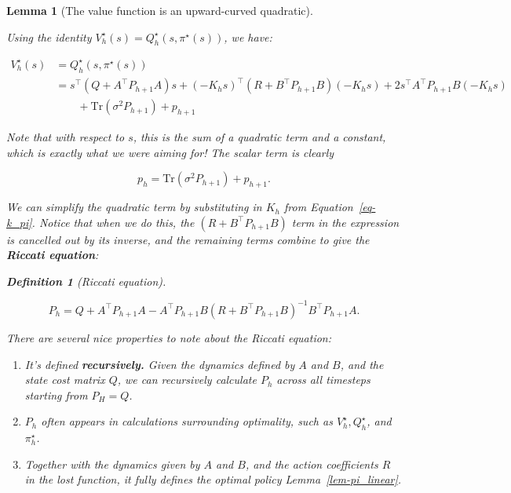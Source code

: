 \documentclass[
  letterpaper,
  DIV=11,
  numbers=noendperiod]{scrreprt}
\providecommand{\tightlist}{%
  \setlength{\itemsep}{0pt}\setlength{\parskip}{0pt}}\usepackage{longtable,booktabs,array}
\theoremstyle{plain}
\newtheorem{lemma}{Lemma}[chapter]
\theoremstyle{plain}
\theoremstyle{definition}
\theoremstyle{definition}
\newtheorem{definition}{Definition}[chapter]
\theoremstyle{remark}
\begin{document}
\begin{lemma}[The value function is an upward-curved
quadratic]\protect\hypertarget{lem-upward-curved}{}\label{lem-upward-curved}

Using the identity \(V^\star_h(s) = Q^\star_h(s, \pi^\star(s))\), we
have:

\[
\begin{aligned}
    V^\star_h(s) & = Q^\star_h(s, \pi^\star(s))                                                                \\
                     & = s^\top (Q + A^\top P_{h+1} A) s+ (-K_hs)^\top (R + B^\top P_{h+1} B) (-K_hs)
    + 2s^\top A^\top P_{h+1} B (-K_hs)                                                                          \\
                     & \qquad + \mathrm{Tr}(\sigma^2 P_{h+1}) + p_{h+1}
\end{aligned}
\]

Note that with respect to \(s\), this is the sum of a quadratic term and
a constant, which is exactly what we were aiming for! The scalar term is
clearly

\[p_h= \mathrm{Tr}(\sigma^2 P_{h+1}) + p_{h+1}.\]

We can simplify the quadratic term by substituting in \(K_h\) from
Equation~\ref{eq-k_pi}. Notice that when we do this, the
\((R+B^\top P_{h+1} B)\) term in the expression is cancelled out by its
inverse, and the remaining terms combine to give the \textbf{Riccati
equation}:

\begin{definition}[Riccati
equation]\protect\hypertarget{def-riccati}{}\label{def-riccati}

\[
P_h= Q + A^\top P_{h+1} A - A^\top P_{h+1} B (R + B^\top P_{h+1} B)^{-1} B^\top P_{h+1} A.
\]

\end{definition}

There are several nice properties to note about the Riccati equation:

\begin{enumerate}
\def\labelenumi{\arabic{enumi}.}
\tightlist
\item
  It's defined \textbf{recursively.} Given the dynamics defined by \(A\)
  and \(B\), and the state cost matrix \(Q\), we can recursively
  calculate \(P_h\) across all timesteps starting from \(P_H= Q\).
\item
  \(P_h\) often appears in calculations surrounding optimality, such as
  \(V^\star_h, Q^\star_h\), and \(\pi^\star_h\).
\item
  Together with the dynamics given by \(A\) and \(B\), and the action
  coefficients \(R\) in the lost function, it fully defines the optimal
  policy Lemma~\ref{lem-pi_linear}.
\end{enumerate}


\end{lemma}
\end{document}
